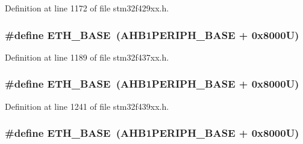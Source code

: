 Definition at line 1172 of file stm32f429xx.\+h.

\subsubsection[{\texorpdfstring{E\+T\+H\+\_\+\+B\+A\+SE}{ETH_BASE}}]{\setlength{\rightskip}{0pt plus 5cm}\#define E\+T\+H\+\_\+\+B\+A\+SE~({\bf A\+H\+B1\+P\+E\+R\+I\+P\+H\+\_\+\+B\+A\+SE} + 0x8000\+U)}\hypertarget{group___peripheral__memory__map_gad965a7b1106ece575ed3da10c45c65cc}{}\label{group___peripheral__memory__map_gad965a7b1106ece575ed3da10c45c65cc}


Definition at line 1189 of file stm32f437xx.\+h.

\subsubsection[{\texorpdfstring{E\+T\+H\+\_\+\+B\+A\+SE}{ETH_BASE}}]{\setlength{\rightskip}{0pt plus 5cm}\#define E\+T\+H\+\_\+\+B\+A\+SE~({\bf A\+H\+B1\+P\+E\+R\+I\+P\+H\+\_\+\+B\+A\+SE} + 0x8000\+U)}\hypertarget{group___peripheral__memory__map_gad965a7b1106ece575ed3da10c45c65cc}{}\label{group___peripheral__memory__map_gad965a7b1106ece575ed3da10c45c65cc}


Definition at line 1241 of file stm32f439xx.\+h.

\subsubsection[{\texorpdfstring{E\+T\+H\+\_\+\+B\+A\+SE}{ETH_BASE}}]{\setlength{\rightskip}{0pt plus 5cm}\#define E\+T\+H\+\_\+\+B\+A\+SE~({\bf A\+H\+B1\+P\+E\+R\+I\+P\+H\+\_\+\+B\+A\+SE} + 0x8000\+U)}\hypertarget{group___peripheral__memory__map_gad965a7b1106ece575ed3da10c45c65cc}{}\label{group___peripheral__memory__map_gad965a7b1106ece575ed3da10c45c65cc}


